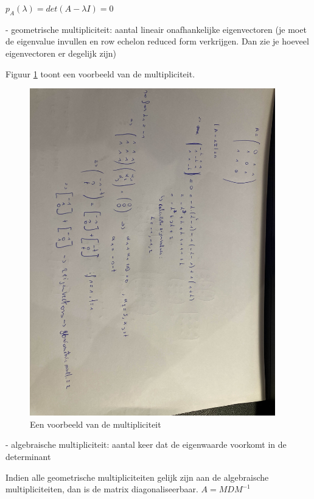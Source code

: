 \documentclass[a4paper]{report}
\begin{document}
$p_A(\lambda) = det(A - \lambda I) = 0$

- geometrische multipliciteit: aantal lineair onafhankelijke eigenvectoren (je moet de eigenvalue invullen en row echelon reduced form verkrijgen. Dan zie je hoeveel eigenvectoren er degelijk zijn)

Figuur \ref{fig:mult} toont een voorbeeld van de multipliciteit.

\begin{figure}[H]
	\begin{center}
		\includegraphics[width=0.95\textwidth]{./images/mult.jpg}
	\end{center}
	\caption{Een voorbeeld van de multipliciteit}
	\label{fig:mult}
\end{figure}

- algebraische multipliciteit: aantal keer dat de eigenwaarde voorkomt in de determinant

Indien alle geometrische multipliciteiten gelijk zijn aan de algebraische multipliciteiten, dan is de matrix diagonaliseerbaar.
$A = MDM^{-1}$
\end{document}
